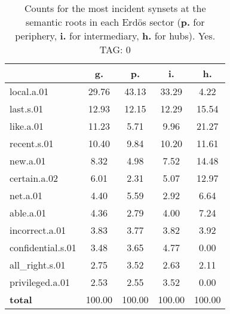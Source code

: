 \begin{table}[h!]
\begin{center}
\begin{tabular}{| l || c | c | c | c |}\hline
 & {\bf g.} & {\bf p.} & {\bf i.} & {\bf h.} \\\hline\hline
local.a.01 & 29.76  & 43.13  & 33.29  & 4.22 \\\hline
last.s.01 & 12.93  & 12.15  & 12.29  & 15.54 \\\hline
like.a.01 & 11.23  & 5.71  & 9.96  & 21.27 \\\hline
recent.s.01 & 10.40  & 9.84  & 10.20  & 11.61 \\\hline
new.a.01 & 8.32  & 4.98  & 7.52  & 14.48 \\\hline
certain.a.02 & 6.01  & 2.31  & 5.07  & 12.97 \\\hline
net.a.01 & 4.40  & 5.59  & 2.92  & 6.64 \\\hline
able.a.01 & 4.36  & 2.79  & 4.00  & 7.24 \\\hline
incorrect.a.01 & 3.83  & 3.77  & 3.82  & 3.92 \\\hline
confidential.s.01 & 3.48  & 3.65  & 4.77  & 0.00 \\\hline
all\_right.s.01 & 2.75  & 3.52  & 2.63  & 2.11 \\\hline
privileged.a.01 & 2.53  & 2.55  & 3.52  & 0.00 \\\hline\hline
{{\bf total}} & 100.00  & 100.00  & 100.00  & 100.00 \\\hline
\end{tabular}
\caption{Counts for the most incident synsets at the semantic roots in each Erd\"os sector ({\bf p.} for periphery, {\bf i.} for intermediary, {\bf h.} for hubs). Yes. TAG: 0}
\end{center}
\end{table}